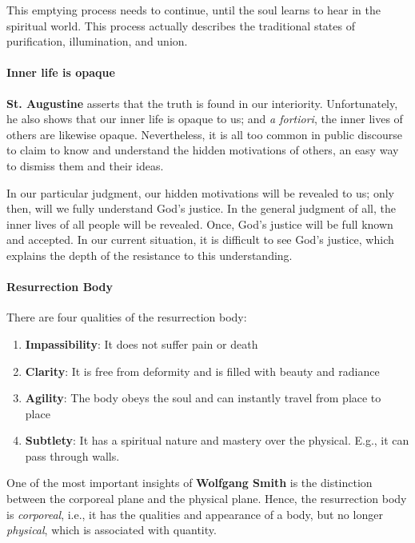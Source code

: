 This emptying process needs to continue, until the soul learns to hear in the spiritual world. This process actually describes the traditional states of purification, illumination, and union.

\paragraph{Inner life is opaque}


\textbf{St. Augustine} asserts that the truth is found in our interiority. Unfortunately, he also shows that our inner life is opaque to us; and \emph{a fortiori}, the inner lives of others are likewise opaque. Nevertheless, it is all too common in public discourse to claim to know and understand the hidden motivations of others, an easy way to dismiss them and their ideas.

In our particular judgment, our hidden motivations will be revealed to us; only then, will we fully understand God's justice. In the general judgment of all, the inner lives of all people will be revealed. Once, God's justice will be full known and accepted. In our current situation, it is difficult to see God's justice, which explains the depth of the resistance to this understanding.

\paragraph{Resurrection Body}


There are four qualities of the resurrection body:

\begin{enumerate}


\item \textbf{Impassibility}: It does not suffer pain or death

\item \textbf{Clarity}: It is free from deformity and is filled with beauty and radiance

\item \textbf{Agility}: The body obeys the soul and can instantly travel from place to place

\item \textbf{Subtlety}: It has a spiritual nature and mastery over the physical. E.g., it can pass through walls.
\end{enumerate}


One of the most important insights of \textbf{Wolfgang Smith} is the distinction between the corporeal plane and the physical plane. Hence, the resurrection body is \emph{corporeal}, i.e., it has the qualities and appearance of a body, but no longer \emph{physical}, which is associated with quantity.

